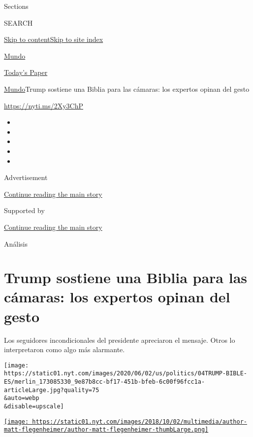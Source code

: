 Sections

SEARCH

\protect\hyperlink{site-content}{Skip to
content}\protect\hyperlink{site-index}{Skip to site index}

\href{https://www.nytimes.com/es/section/mundo}{Mundo}

\href{https://myaccount.nytimes.com/auth/login?response_type=cookie\&client_id=vi}{}

\href{https://www.nytimes.com/section/todayspaper}{Today's Paper}

\href{/es/section/mundo}{Mundo}\textbar{}Trump sostiene una Biblia para
las cámaras: los expertos opinan del gesto

\url{https://nyti.ms/2Xy3ChP}

\begin{itemize}
\item
\item
\item
\item
\item
\end{itemize}

Advertisement

\protect\hyperlink{after-top}{Continue reading the main story}

Supported by

\protect\hyperlink{after-sponsor}{Continue reading the main story}

Análisis

\hypertarget{trump-sostiene-una-biblia-para-las-cuxe1maras-los-expertos-opinan-del-gesto}{%
\section{Trump sostiene una Biblia para las cámaras: los expertos opinan
del
gesto}\label{trump-sostiene-una-biblia-para-las-cuxe1maras-los-expertos-opinan-del-gesto}}

Los seguidores incondicionales del presidente apreciaron el mensaje.
Otros lo interpretaron como algo más alarmante.

\texttt{[image: https://static01.nyt.com/images/2020/06/02/us/politics/04TRUMP-BIBLE-ES/merlin\_173085330\_9e87b8cc-bf17-451b-bfeb-6c00f96fcc1a-articleLarge.jpg?quality=75\\\&auto=webp\\\&disable=upscale]}

\href{https://www.nytimes.com/by/matt-flegenheimer}{\texttt{[image: https://static01.nyt.com/images/2018/10/02/multimedia/author-matt-flegenheimer/author-matt-flegenheimer-thumbLarge.png]}}

